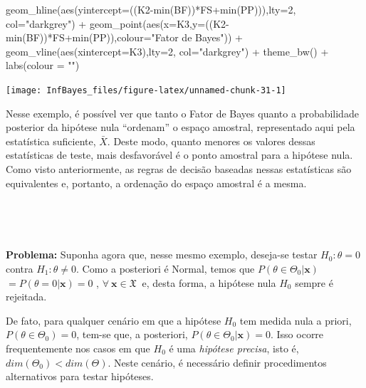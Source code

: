 \documentclass[
]{book}
\newenvironment{Shaded}{\begin{snugshade}}{\end{snugshade}}
\newcommand{\AttributeTok}[1]{\textcolor[rgb]{0.77,0.63,0.00}{#1}}
\newcommand{\DecValTok}[1]{\textcolor[rgb]{0.00,0.00,0.81}{#1}}
\newcommand{\FunctionTok}[1]{\textcolor[rgb]{0.00,0.00,0.00}{#1}}
\newcommand{\NormalTok}[1]{#1}
\newcommand{\SpecialCharTok}[1]{\textcolor[rgb]{0.00,0.00,0.00}{#1}}
\newcommand{\StringTok}[1]{\textcolor[rgb]{0.31,0.60,0.02}{#1}}
\begin{document}
\begin{Shaded}
\begin{Highlighting}[]
    \FunctionTok{geom\_hline}\NormalTok{(}\FunctionTok{aes}\NormalTok{(}\AttributeTok{yintercept=}\NormalTok{((K2}\SpecialCharTok{{-}}\FunctionTok{min}\NormalTok{(BF))}\SpecialCharTok{*}\NormalTok{FS}\SpecialCharTok{+}\FunctionTok{min}\NormalTok{(PP))),}\AttributeTok{lty=}\DecValTok{2}\NormalTok{, }\AttributeTok{col=}\StringTok{"darkgrey"}\NormalTok{) }\SpecialCharTok{+}
    \FunctionTok{geom\_point}\NormalTok{(}\FunctionTok{aes}\NormalTok{(}\AttributeTok{x=}\NormalTok{K3,}\AttributeTok{y=}\NormalTok{((K2}\SpecialCharTok{{-}}\FunctionTok{min}\NormalTok{(BF))}\SpecialCharTok{*}\NormalTok{FS}\SpecialCharTok{+}\FunctionTok{min}\NormalTok{(PP)),}\AttributeTok{colour=}\StringTok{"Fator de Bayes"}\NormalTok{)) }\SpecialCharTok{+}
    \FunctionTok{geom\_vline}\NormalTok{(}\FunctionTok{aes}\NormalTok{(}\AttributeTok{xintercept=}\NormalTok{K3),}\AttributeTok{lty=}\DecValTok{2}\NormalTok{, }\AttributeTok{col=}\StringTok{"darkgrey"}\NormalTok{) }\SpecialCharTok{+}
    \FunctionTok{theme\_bw}\NormalTok{() }\SpecialCharTok{+} \FunctionTok{labs}\NormalTok{(}\AttributeTok{colour =} \StringTok{""}\NormalTok{)}
\end{Highlighting}
\end{Shaded}

\begin{center}\texttt{[image: InfBayes\_files/figure-latex/unnamed-chunk-31-1]} \end{center}

Nesse exemplo, é possível ver que tanto o Fator de Bayes quanto a probabilidade posterior da hipótese nula ``ordenam'' o espaço amostral, representado aqui pela estatística suficiente, \(\bar{X}\). Deste modo, quanto menores os valores dessas estatísticas de teste, mais desfavorável é o ponto amostral para a hipótese nula. Como visto anteriormente, as regras de decisão baseadas nessas estatísticas são equivalentes e, portanto, a ordenação do espaço amostral é a mesma.

\(~\)

\(~\)

\textbf{Problema:} Suponha agora que, nesse mesmo exemplo, deseja-se testar \(H_0:\theta=0\) contra \(H_1: \theta\neq 0\). Como a posteriori é Normal, temos que \(P(\theta \in \Theta_0|\boldsymbol x)\) \(=P(\theta=0|\boldsymbol x)=0\) , \(\forall~ \boldsymbol x\in \mathfrak{X}~\) e, desta forma, a hipótese nula \(H_0\) sempre é rejeitada.

De fato, para qualquer cenário em que a hipótese \(H_0\) tem medida nula a priori, \(P(\theta \in \Theta_0)=0\), tem-se que, a posteriori, \(P(\theta \in \Theta_0|\boldsymbol x)=0\). Isso ocorre frequentemente nos casos em que \(H_0\) é uma \emph{hipótese precisa}, isto é, \(dim(\Theta_0)<dim(\Theta)\). Neste cenário, é necessário definir procedimentos alternativos para testar hipóteses.
\end{document}
